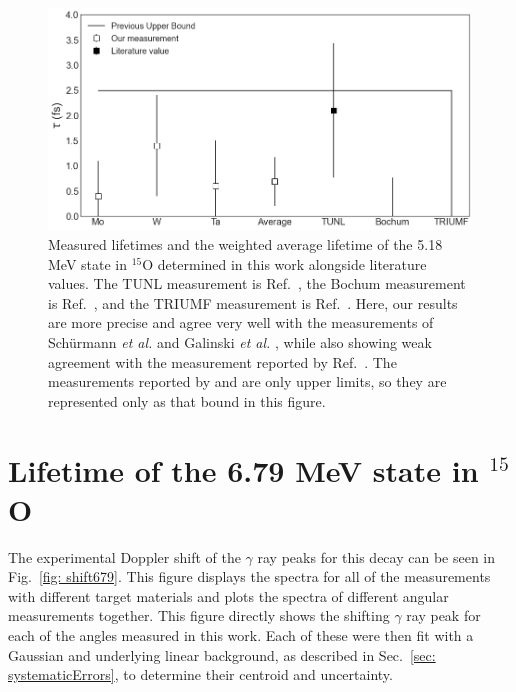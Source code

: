 \begin{figure}
\centering
\includegraphics[width=\linewidth]{figures/lifetimes617.png}
\caption{Measured lifetimes and the weighted average lifetime of the 5.18 MeV state in $^{15}$O determined in this work alongside literature values. The TUNL measurement is Ref.\ \cite{Bertone2001}, the Bochum measurement is Ref.\ \cite{Schurmann2008}, and the TRIUMF measurement is Ref.\ \cite{Galinski2014}. Here, our results are more precise and agree very well with the measurements of Sch{\"u}rmann \textit{et al.} \cite{Schurmann2008} and Galinski \textit{et al.} \cite{Galinski2014}, while also showing weak agreement with the measurement reported by Ref.\ \cite{Bertone2001}. The measurements reported by \citet{Schurmann2008} and \citet{Galinski2014} are only upper limits, so they are represented only as that bound in this figure.}
\label{fig: lifetimes617}
\end{figure}



\section{Lifetime of the 6.79 MeV state in $^{15}$O}
\label{sec: lifetime679}


The experimental Doppler shift of the $\gamma$ ray peaks for this decay can be seen in Fig.\ \ref{fig: shift679}. This figure displays the spectra for all of the measurements with different target materials and plots the spectra of different angular measurements together. This figure directly shows the shifting $\gamma$ ray peak for each of the angles measured in this work. Each of these were then fit with a Gaussian and underlying linear background, as described in Sec.\ \ref{sec: systematicErrors}, to determine their centroid and uncertainty. 


